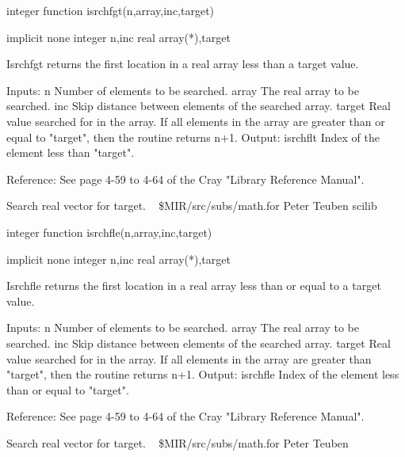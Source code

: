 \par{\tenpoint
{\eightpoint\begintt
        integer function isrchfgt(n,array,inc,target)

        implicit none
        integer n,inc
        real array(*),target

  Isrchfgt returns the first location in a real array less than a target value.

  Inputs:
    n          Number of elements to be searched.
    array      The real array to be searched.
    inc        Skip distance between elements of the searched array.
    target     Real value searched for in the array. If all elements
               in the array are greater than or equal to "target", then
               the routine returns n+1.
  Output:
    isrchflt   Index of the element less than "target".

  Reference:
  See page 4-59 to 4-64 of the Cray "Library Reference Manual".
\endtt}
\par}
%
\noindent Search real vector for target.
\newline \ 
\newline {} \$MIR/src/subs/math.for
\newline {} Peter Teuben
\newline {} scilib
\par{\tenpoint
{\eightpoint\begintt
        integer function isrchfle(n,array,inc,target)

        implicit none
        integer n,inc
        real array(*),target

  Isrchfle returns the first location in a real array less than or equal to
  a target value.

  Inputs:
    n          Number of elements to be searched.
    array      The real array to be searched.
    inc        Skip distance between elements of the searched array.
    target     Real value searched for in the array. If all elements
               in the array are greater than "target", then
               the routine returns n+1.
  Output:
    isrchfle   Index of the element less than or equal to "target".

  Reference:
  See page 4-59 to 4-64 of the Cray "Library Reference Manual".
\endtt}
\par}
%
\noindent Search real vector for target.
\newline \ 
\newline {} \$MIR/src/subs/math.for
\newline {} Peter Teuben
